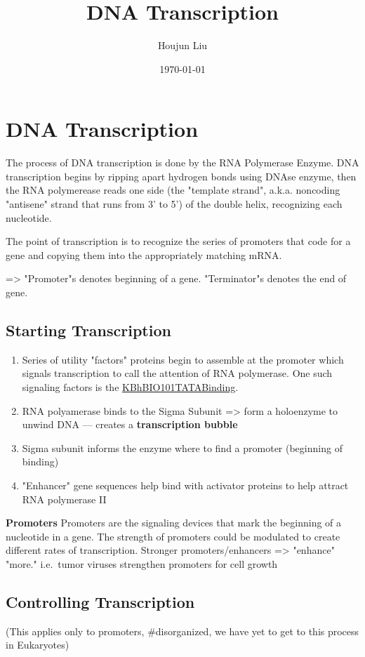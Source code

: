 \documentclass[letterpaper]{article}
\author{Houjun Liu}
\date{\today}
\title{DNA Transcription}
\renewcommand{\tableofcontents}{}
\begin{document}
\tableofcontents



\section{DNA Transcription}
\label{sec:org79bf0d9}
The process of DNA transcription is done by the RNA Polymerase Enzyme.
DNA transcription begins by ripping apart hydrogen bonds using DNAse
enzyme, then the RNA polymerease reads one side (the "template strand",
a.k.a. noncoding "antisene" strand that runs from 3' to 5') of the
double helix, recognizing each nucleotide.

The point of transcription is to recognize the series of promoters that
code for a gene and copying them into the appropriately matching mRNA.

=> "Promoter"s denotes beginning of a gene. "Terminator"s denotes the
end of gene.

\subsection{Starting Transcription}
\label{sec:org99b4e98}
\begin{enumerate}
\item Series of utility "factors" proteins begin to assemble at the
promoter which signals transcription to call the attention of RNA
polymerase. One such signaling factors is the
\href{KBhBIO101TATABinding.org}{KBhBIO101TATABinding}.
\item RNA polyamerase binds to the Sigma Subunit => form a holoenzyme to
unwind DNA --- creates a \textbf{transcription bubble}
\item Sigma subunit informs the enzyme where to find a promoter (beginning
of binding)
\item "Enhancer" gene sequences help bind with activator proteins to help
attract RNA polymerase II
\end{enumerate}

\textbf{Promoters} Promoters are the signaling devices that mark the beginning
of a nucleotide in a gene. The strength of promoters could be modulated
to create different rates of transcription. Stronger promoters/enhancers
=> "enhance" "more." i.e. tumor viruses strengthen promoters for cell
growth

\subsection{Controlling Transcription}
\label{sec:orgbc9548e}
(This applies only to promoters, \#disorganized, we have yet to get to
this process in Eukaryotes)
\end{document}
